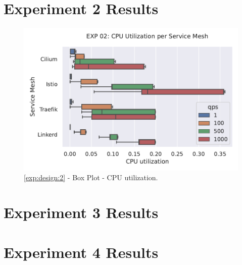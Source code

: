 \section{Experiment 2 Results}

\begin{figure}[h]
    \centering
    
    \includegraphics[width=\linewidth]{5_experimental_evaluation/figures/exp_02-cpu-boxplot.pdf}

    \caption{\ref{exp:design:2} - Box Plot - CPU utilization.}
    
    \label{fig:appendix:exp:result:02:cpu-boxplot}
\end{figure}


\section{Experiment 3 Results}

\section{Experiment 4 Results}
